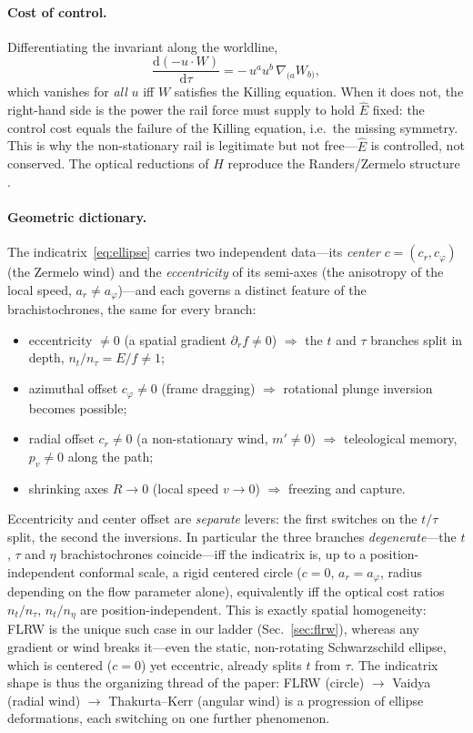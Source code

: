 \documentclass[
    aps, prd, twocolumn, superscriptaddress,
    showpacs, nofootinbib, floatfix
]{revtex4-2}
\newcommand{\Ehat}{\hat E}
\newcommand{\dd}{\mathrm{d}}
\begin{document}
\paragraph{Cost of control.} Differentiating the invariant along the worldline,
\begin{equation}
    \frac{\dd(-u\cdot W)}{\dd\tau}=-\,u^a u^b\,\nabla_{(a}W_{b)},
    \label{eq:cost}
\end{equation}
which vanishes for \emph{all} $u$ iff $W$ satisfies the Killing equation. When it
does not, the right-hand side is the power the rail force must supply to hold
$\Ehat$ fixed: the control cost equals the failure of the Killing equation, i.e.\
the missing symmetry. This is why the non-stationary rail is legitimate but not
free---$\Ehat$ is controlled, not conserved. The optical reductions of $H$
reproduce the Randers/Zermelo structure
\cite{GibbonsRanders2009,CaponioWind}.

\paragraph{Geometric dictionary.} The indicatrix~\eqref{eq:ellipse} carries two
independent data---its \emph{center} $c=(c_r,c_\varphi)$ (the Zermelo wind) and
the \emph{eccentricity} of its semi-axes (the anisotropy of the local speed,
$a_r\neq a_\varphi$)---and each governs a distinct feature of the
brachistochrones, the same for every branch:
\begin{itemize}\itemsep2pt
\item eccentricity $\neq0$ (a spatial gradient $\partial_r f\neq0$)
$\Rightarrow$ the $t$ and $\tau$ branches split in depth, $n_t/n_\tau=E/f\neq1$;
\item azimuthal offset $c_\varphi\neq0$ (frame dragging)
$\Rightarrow$ rotational plunge inversion becomes possible;
\item radial offset $c_r\neq0$ (a non-stationary wind, $m'\neq0$)
$\Rightarrow$ teleological memory, $p_v\neq0$ along the path;
\item shrinking axes $R\to0$ (local speed $v\to0$) $\Rightarrow$ freezing and
capture.
\end{itemize}
Eccentricity and center offset are \emph{separate} levers: the first switches on
the $t/\tau$ split, the second the inversions. In particular the three branches
\emph{degenerate}---the $t$, $\tau$ and $\eta$ brachistochrones coincide---iff the
indicatrix is, up to a position-independent conformal scale, a rigid centered
circle ($c=0$, $a_r=a_\varphi$, radius depending on the flow parameter alone),
equivalently iff the optical cost ratios $n_t/n_\tau,\,n_t/n_\eta$ are
position-independent. This is exactly spatial homogeneity: FLRW is the unique
such case in our ladder (Sec.~\ref{sec:flrw}), whereas any gradient or wind
breaks it---even the static, non-rotating Schwarzschild ellipse, which is
centered ($c=0$) yet eccentric, already splits $t$ from $\tau$. The indicatrix
shape is thus the organizing thread of the paper: FLRW (circle) $\to$ Vaidya
(radial wind) $\to$ Thakurta--Kerr (angular wind) is a progression of ellipse
deformations, each switching on one further phenomenon.
\end{document}
